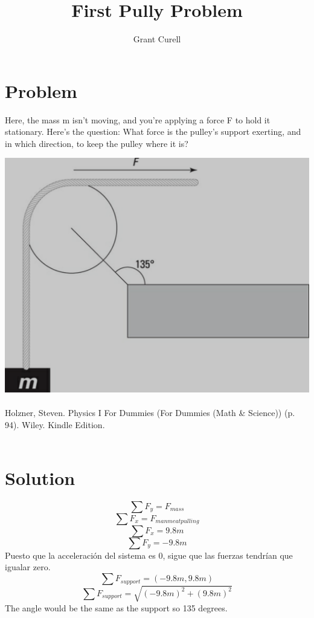 \documentclass{article}
\title{First Pully Problem}
\author{Grant Curell}
\begin{document}
\maketitle{}
\section{Problem}
Here, the mass m isn’t moving, and you’re applying a force F to hold it stationary. Here’s the question: What force is the pulley’s support exerting, and in which direction, to keep the pulley where it is?

\includegraphics[width=\columnwidth]{image}
\\\\
Holzner, Steven. Physics I For Dummies (For Dummies (Math \& Science)) (p. 94). Wiley. Kindle Edition.
\\\\
\section{Solution}
\[ \sum F_y=F_{mass} \]
\[ \sum F_x=F_{manmeat pulling} \]
\[ \sum F_x=9.8m \]
\[ \sum F_y=-9.8m \]
Puesto que la acceleración del sistema es 0, sigue que las fuerzas tendrían
que igualar zero.
\[ \sum F_{support}=(-9.8m,9.8m) \]
\[ \sum F_{support}=\sqrt{(-9.8m)^2+(9.8m)^2} \]
The angle would be the same as the support so 135 degrees.
\end{document}

